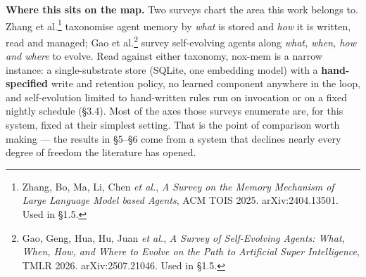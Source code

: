 \documentclass[
]{article}
\begin{document}
\textbf{Where this sits on the map.} Two surveys chart the area this
work belongs to. Zhang et al.\footnote{Zhang, Bo, Ma, Li, Chen \emph{et
  al.}, \emph{A Survey on the Memory Mechanism of Large Language Model
  based Agents}, ACM TOIS 2025. arXiv:2404.13501. Used in §1.5.}
taxonomise agent memory by \emph{what} is stored and \emph{how} it is
written, read and managed; Gao et al.\footnote{Gao, Geng, Hua, Hu, Juan
  \emph{et al.}, \emph{A Survey of Self-Evolving Agents: What, When,
  How, and Where to Evolve on the Path to Artificial Super
  Intelligence}, TMLR 2026. arXiv:2507.21046. Used in §1.5.} survey
self-evolving agents along \emph{what, when, how and where} to evolve.
Read against either taxonomy, nox-mem is a narrow instance: a
single-substrate store (SQLite, one embedding model) with a
\textbf{hand-specified} write and retention policy, no learned component
anywhere in the loop, and self-evolution limited to hand-written rules
run on invocation or on a fixed nightly schedule (§3.4). Most of the
axes those surveys enumerate are, for this system, fixed at their
simplest setting. That is the point of comparison worth making --- the
results in §5--§6 come from a system that declines nearly every degree
of freedom the literature has opened.
\end{document}
